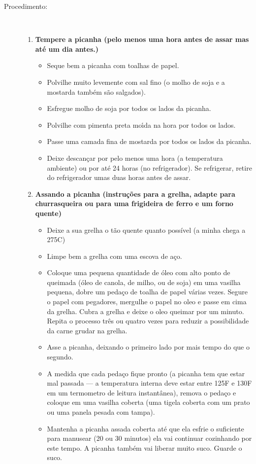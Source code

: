 \documentclass [11pt, letterpaper] {article}
\begin{document}
\begin{description}
\item[Procedimento:]\ \\
	\begin{enumerate}
	\item {\bf Tempere a picanha (pelo menos uma hora antes de assar mas at\'e um dia antes.)}
	\begin{itemize}
	\item Seque bem a picanha com toalhas de papel.
	\item Polvilhe muito levemente com sal fino (o molho de soja e a mostarda tamb\'em s\~ao salgados).
	\item Esfregue molho de soja por todos os lados da picanha.
	\item Polvilhe com pimenta preta mo\'{\i}da na hora por todos os lados.
	\item Passe uma camada fina de mostarda por todos os lados da picanha.
	\item Deixe descan\c{c}ar por pelo menos uma hora (a temperatura ambiente) ou por at\'e 24 horas (no refrigerador). Se refrigerar, retire do refrigerador umas duas horas antes de assar.
	\end{itemize}
	\item {\bf Assando a picanha (instru\c{c}\~oes para a grelha, adapte para churrasqueira ou para uma frigideira de ferro e um forno quente)}
	\begin{itemize}
	\item Deixe a sua grelha o t\~ao quente quanto poss\'ivel (a minha chega a 275C) 
	\item Limpe bem a grelha com uma escova de a\c{c}o.
	 \item Coloque uma pequena quantidade de \'oleo com alto ponto de queimada (\'oleo de canola, de milho, ou de soja) em uma vasilha pequena, dobre um peda\c{c}o de toalha de papel v\'arias vezes. Segure o papel com pegadores, mergulhe o papel no oleo e passe em cima da grelha. Cubra a grelha e deixe o oleo queimar por um minuto. Repita o processo tr\^es ou quatro vezes para reduzir a possibilidade da carne grudar na grelha.
	 \item Asse a picanha, deixando o primeiro lado por mais tempo do que o segundo.
	 \item A medida que cada peda\c{c}o fique pronto (a picanha tem que estar mal passada --- a temperatura interna deve estar entre 125F e 130F em um termometro de leitura instant\^anea), remova o peda\c{c}o e coloque em uma vasilha coberta (uma tigela coberta com um prato ou uma panela pesada com tampa).
	 \item Mantenha a picanha assada coberta at\'e que ela esfrie o suficiente para manusear (20 ou 30 minutos) ela vai continuar cozinhando por este tempo. A picanha tamb\'em vai liberar muito suco. Guarde o suco.

\end{itemize}
\end{enumerate}
\end{description}
\end{document}
